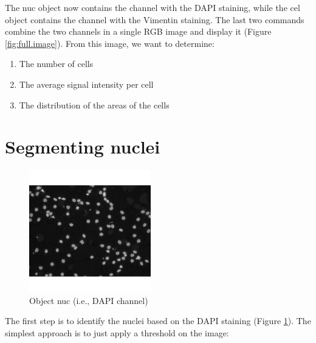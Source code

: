 \documentclass{article}\usepackage[]{graphicx}\usepackage[]{color}
\newenvironment{knitrout}{}{} %
\begin{document}
The nuc object now contains the channel with the DAPI staining, while the cel object contains the channel with the Vimentin staining.
The last two commands combine the two channels in a single RGB image and display it (Figure \ref{fig:full.image}). From this image, we want to determine:
\begin{enumerate}
  \item The number of cells
  \item The average signal intensity per cell
  \item The distribution of the areas of the cells
\end{enumerate}

\section{Segmenting nuclei}
\begin{knitrout}
\color{fgcolor}\begin{figure}

{\centering \includegraphics[width=200px]{knit_figure/figdapi-1} 

}

\caption[Object nuc (i]{Object nuc (i.e., DAPI channel)\label{fig:dapi}}
\end{figure}


\end{knitrout}
The first step is to identify the nuclei based on the DAPI staining (Figure \ref{fig:dapi}).
The simplest approach is to just apply a threshold on the image:
\end{document}
